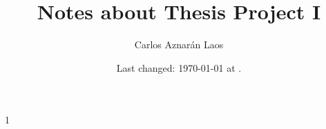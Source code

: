 \usepackage{mathtools}
\usepackage[ISO]{diffcoeff}
\usepackage[useregional]{datetime2}
\usepackage[
]{biblatex}


\providecommand{\continuous}{C\left(\interval\right)}
\providecommand{\interval}{\left[a,b\right]}
\providecommand{\openinterval}{\left(a,b\right)}
\providecommand{\nodalset}{X={\left\{x_{i}\right\}}_{i=0}^{n}}
\providecommand{\concentration}{u\left(x,t\right)}
\providecommand{\averageconcentration}{\overline{u}\left(x,t\right)}
\providecommand{\inner}[2]{\left\langle #1, #2 \right\rangle}







\author{Carlos Aznarán Laos}
\title{Notes about Thesis Project I}

\def\Book{1}
\Book
\else
\fi

\date{
	Last changed: \today{} at \DTMcurrenttime.
}
